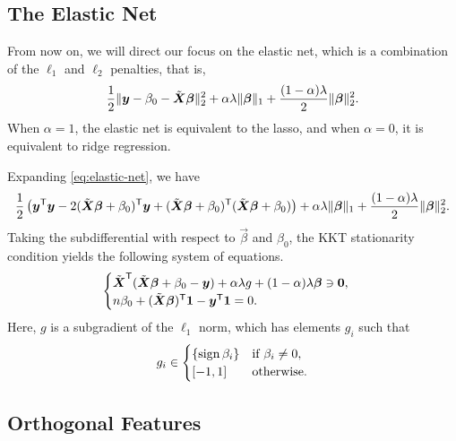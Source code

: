 \subsection{The Elastic Net}

From now on, we will direct our focus on the elastic net, which is a combination of the \(\ell_1\) and \(\ell_2\) penalties, that is,
\begin{equation}
  \label{eq:elastic-net}
  \frac{1}{2} \lVert \boldsymbol y - \beta_0 - \tilde{\boldsymbol{X}}\boldsymbol{\beta} \rVert^2_2  + \alpha\lambda \lVert \boldsymbol\beta \rVert_1 + \frac{(1 - \alpha)\lambda}{2}\lVert \boldsymbol \beta \rVert_2^2.
\end{equation}
When \(\alpha = 1\), the elastic net is equivalent to the lasso, and when \(\alpha = 0\), it is equivalent to ridge regression.

Expanding \eqref{eq:elastic-net}, we have
\[
  \begin{aligned}
    \frac{1}{2}\left( \boldsymbol y^{\mathsf{T}} \boldsymbol y - 2(\tilde{\boldsymbol{X}}\boldsymbol{\beta} + \beta_0)^{\mathsf{T}}\boldsymbol{y} + (\tilde{\boldsymbol{X}}\boldsymbol{\beta} + \beta_0)^{\mathsf{T}}(\tilde{\boldsymbol{X}}\boldsymbol{\beta} + \beta_0)\right) + \alpha\lambda \lVert \boldsymbol\beta \rVert_1 + \frac{(1 - \alpha)\lambda}{2}\lVert \boldsymbol \beta \rVert_2^2.
  \end{aligned}
\]
Taking the subdifferential with respect to \(\vec{\beta}\) and \(\beta_0\), the KKT stationarity condition yields the following system of equations.
\begin{equation}
  \label{eq:kkt-elasticnet}
  \begin{cases}
    \tilde{\boldsymbol{X}}^{\mathsf{T}}(\tilde{\boldsymbol{X}}\boldsymbol{\beta} + \beta_0 - \boldsymbol{y}) + \alpha\lambda g + (1 - \alpha)\lambda \boldsymbol\beta \ni \boldsymbol{0}, \\
    n \beta_0 + (\tilde{\boldsymbol{X}}\boldsymbol{\beta})^{\mathsf{T}} \boldsymbol{1} - \boldsymbol{y}^{\mathsf{T}} \boldsymbol{1} = 0.
  \end{cases}
\end{equation}
Here, \(g\) is a subgradient of the \(\ell_1\) norm, which has elements \(g_i\) such that
\[
  g_i \in
  \begin{cases}
    \{\operatorname{sign}{\beta_i}\} & \text{if } \beta_i \neq 0, \\
    [-1, 1]            & \text{otherwise}.
  \end{cases}
\]

\subsection{Orthogonal Features}

